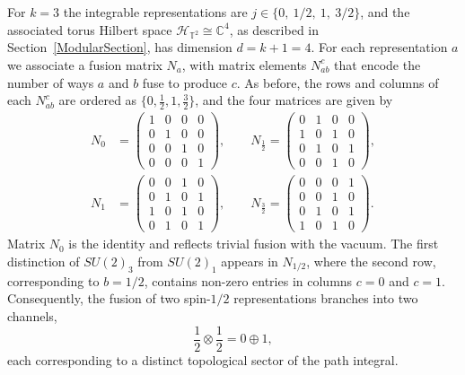 \documentclass[12pt,a4paper]{article}
\begin{document}
For $k = 3$ the integrable representations are $j \in \{0,\ 1/2,\ 1,\ 3/2\}$, and the associated torus Hilbert space $\mathcal{H}_{\mathbb{T}^2} \cong \mathbb{C}^4$, as described in Section~\ref{ModularSection}, has dimension $d = k + 1 = 4$. For each representation $a$ we associate a fusion matrix $N_a$, with matrix elements $N^c_{ab}$ that encode the number of ways $a$ and $b$ fuse to produce $c$. As before, the rows and columns of each $N^c_{ab}$ are ordered as $\{0, \frac{1}{2}, 1, \frac{3}{2}\}$, and the four matrices are given by
%
\begin{equation}\label{FusionMatrices_SU23}
\begin{aligned}
N_0 &= \begin{pmatrix} 
1&0&0&0\\
0&1&0&0\\
0&0&1&0\\
0&0&0&1 
\end{pmatrix}, 
\qquad N_{\frac{1}{2}} = \begin{pmatrix} 
0&1&0&0\\
1&0&1&0\\
0&1&0&1\\
0&0&1&0 
\end{pmatrix}, \\[8pt]
N_1 &= \begin{pmatrix} 
0&0&1&0\\
0&1&0&1\\
1&0&1&0\\
0&1&0&1 
\end{pmatrix}, 
\qquad N_{\frac{3}{2}} = \begin{pmatrix} 
0&0&0&1\\
0&0&1&0\\
0&1&0&1\\
1&0&1&0 
\end{pmatrix}.
\end{aligned}
\end{equation}
%
Matrix $N_0$ is the identity and reflects trivial fusion with the vacuum. The first distinction of $SU(2)_3$ from $SU(2)_1$ appears in $N_{1/2}$, where the second row, corresponding to $b = 1/2$, contains non-zero entries in columns $c = 0$ and $c = 1$. Consequently, the fusion of two spin-$1/2$ representations branches into two channels,
%
\begin{equation}\label{BranchingRule}
\frac{1}{2} \otimes \frac{1}{2} = 0 \oplus 1,
\end{equation}
%
each corresponding to a distinct topological sector of the path integral. 
\end{document}
